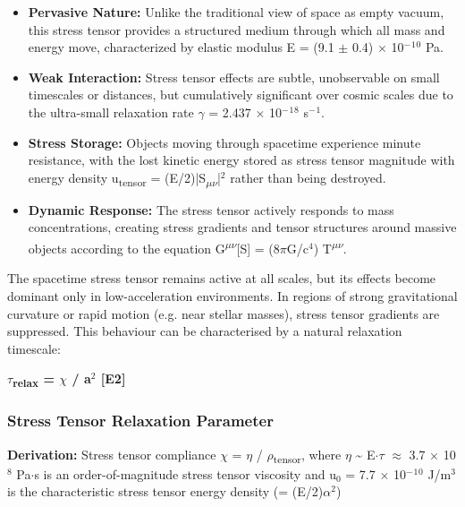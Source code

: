 \documentclass[11pt,a4paper]{article}
\begin{document}
\begin{itemize}
  \item \textbf{Pervasive Nature:} Unlike the traditional view of space as empty vacuum, this stress tensor provides a structured medium through which all mass and energy move, characterized by elastic modulus E = (9.1 $\pm$ 0.4) $\times$ 10$^{-}$$^{1}$$^{0}$ Pa.
  \item \textbf{Weak Interaction:} Stress tensor effects are subtle, unobservable on small timescales or distances, but cumulatively significant over cosmic scales due to the ultra-small relaxation rate $\gamma$ = 2.437 $\times$ 10$^{-}$$^{1}$$^{8}$ s$^{-}$$^{1}$.
  \item \textbf{Stress Storage:} Objects moving through spacetime experience minute resistance, with the lost kinetic energy stored as stress tensor magnitude with energy density u\textsubscript{tensor} = (E/\allowbreak{}2)|S\textsubscript{$\mu$$\nu$}|$^{2}$ rather than being destroyed.
  \item \textbf{Dynamic Response:} The stress tensor actively responds to mass concentrations, creating stress gradients and tensor structures around massive objects according to the equation G\textsuperscript{$\mu$$\nu$}[S] = (8$\pi$G/\allowbreak{}c$^{4}$) T\textsuperscript{$\mu$$\nu$}.
\end{itemize}

The spacetime stress tensor remains active at all scales, but its effects become dominant only in low-acceleration environments. In regions of strong gravitational curvature or rapid motion (e.g. near stellar masses), stress tensor gradients are suppressed. This behaviour can be characterised by a natural relaxation timescale:

\textbf{$\tau$\textsubscript{relax} = $\chi$ / a$^{2}$ [E2]}

\begin{mdframed}[linecolor=accent,linewidth=0.5pt,backgroundcolor=callout-bg,leftline=true,rightline=true,topline=true,bottomline=true,innerleftmargin=8pt,innerrightmargin=8pt,innertopmargin=6pt,innerbottommargin=6pt]
\subsubsection{Stress Tensor Relaxation Parameter}
\textbf{Derivation:} Stress tensor compliance $\chi$ = $\eta$ / $\rho$\textsubscript{tensor}, where $\eta$ \~{} E$\cdot$$\tau$ $\approx$ 3.7 $\times$ 10$^{8}$ Pa$\cdot$s is an order-of-magnitude stress tensor viscosity and u$_{0}$ = 7.7 $\times$ 10$^{-}$$^{1}$$^{0}$ J/\allowbreak{}m$^{3}$ is the characteristic stress tensor energy density (= (E/\allowbreak{}2)$\alpha$$^{2}$)
\end{mdframed}
\end{document}
